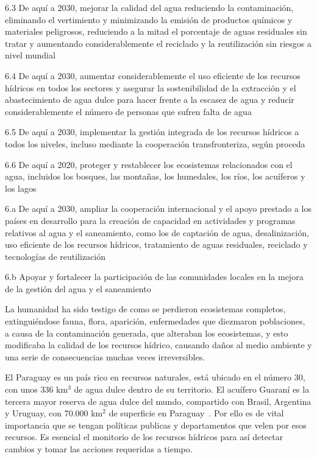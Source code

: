 6.3  De aquí a 2030, mejorar la calidad del agua reduciendo la contaminación, eliminando el vertimiento y minimizando la emisión de productos químicos y materiales peligrosos, reduciendo a la mitad el porcentaje de aguas residuales sin tratar y aumentando considerablemente el reciclado y la reutilización sin riesgos a nivel mundial

6.4  De aquí a 2030, aumentar considerablemente el uso eficiente de los recursos hídricos en todos los sectores y asegurar la sostenibilidad de la extracción y el abastecimiento de agua dulce para hacer frente a la escasez de agua y reducir considerablemente el número de personas que sufren falta de agua

6.5  De aquí a 2030, implementar la gestión integrada de los recursos hídricos a todos los niveles, incluso mediante la cooperación transfronteriza, según proceda

6.6  De aquí a 2020, proteger y restablecer los ecosistemas relacionados con el agua, incluidos los bosques, las montañas, los humedales, los ríos, los acuíferos y los lagos

6.a  De aquí a 2030, ampliar la cooperación internacional y el apoyo prestado a los países en desarrollo para la creación de capacidad en actividades y programas relativos al agua y el saneamiento, como los de captación de agua, desalinización, uso eficiente de los recursos hídricos, tratamiento de aguas residuales, reciclado y tecnologías de reutilización

6.b  Apoyar y fortalecer la participación de las comunidades locales en la mejora de la gestión del agua y el saneamiento


La humanidad ha sido testigo de como se  perdieron  ecosistemas completos, extinguiéndose fauna, flora, aparici\'on, enfermedades que diezmaron poblaciones, a causa de la contaminaci\'on generada, que alteraban los ecosistemas, y esto modificaba la calidad de los recursos h\'idrico, causando da\~nos al medio ambiente y una serie de consecuencias muchas veces irreversibles. 

El Paraguay es un pa\'is rico en recursos naturales, está ubicado en el número 30, con unos 336 km$^3$ de agua dulce dentro de su territorio. 
El acuífero Guaraní es la tercera mayor reserva de agua dulce del mundo, compartido con Brasil, Argentina y Uruguay, con 70.000 km$^{2}$ de superficie en Paraguay~\cite{stp_Agua}. 
Por ello es de vital importancia que se tengan políticas publicas y departamentos que velen por esos recursos.
Es esencial el monitorio de los recursos hídricos para así detectar cambios y tomar las acciones requeridas a tiempo.

